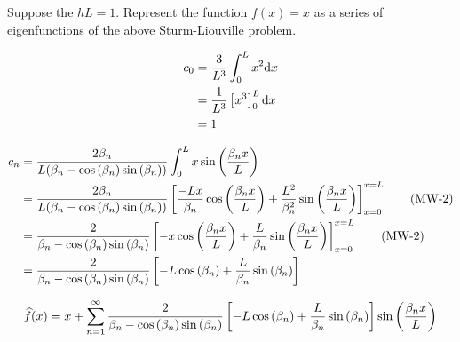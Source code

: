 Suppose the $hL = 1$. Represent the function $f(x) = x$ as a series of eigenfunctions
of the above Sturm-Liouville problem.

\soln*

\begin{align*}
    c_0 &= \frac{3}{L^3} \intl x^2 \dd x \\
    &= \frac{1}{L^3} \brac{x^3}_0^L \dd x \\
    &= 1
\end{align*}

\begin{align*}
    c_n &=
    \frac{2\beta_n}{L(\beta_n - \cosp{\beta_n} \sinp{\beta_n})} \intl x \sinp{\frac{\beta_n x}{L}}\\
    &= \frac{2\beta_n}{L(\beta_n - \cosp{\beta_n} \sinp{\beta_n})} \brac{ \frac{-Lx}{\beta_n} \cosp{\frac{\beta_n x}{L}} + \frac{L^2}{\beta_n^2} \sinp{\frac{\beta_n x}{L}}}_{x=0}^{x=L} \tag{MW-2}\\
    &= \frac{2}{\beta_n - \cosp{\beta_n} \sinp{\beta_n}} \brac{ -x \cosp{\frac{\beta_n x}{L}} + \frac{L}{\beta_n} \sinp{\frac{\beta_n x}{L}}}_{x=0}^{x=L} \tag{MW-2}\\
    &= \frac{2}{\beta_n - \cosp{\beta_n} \sinp{\beta_n}}  \brac{
        -L\cosp{\beta_n}+ \frac{L}{\beta_n} \sinp{\beta_n}
    }
\end{align*}

$$\widehat{f}(x) = x + \sumn{1}  \frac{2}{\beta_n - \cosp{\beta_n} \sinp{\beta_n}}  \brac{
    -L\cosp{\beta_n}+ \frac{L}{\beta_n} \sinp{\beta_n}
}\sinp{\frac{\beta_n x}{L}} $$